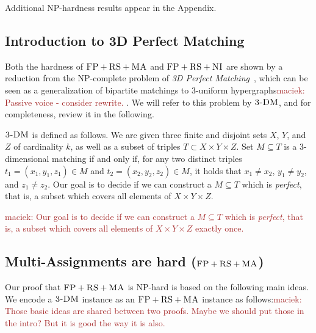 \documentclass[9pt]{sigcomm-alternate}
\newcommand{\maciek}[1]{\textcolor{brown}{maciek: #1}}
\newcommand{\CC}{\textsc{NI}}
\newcommand{\FP}{\textsc{FP}}
\newcommand{\RS}{\textsc{RS}}
\newcommand{\MA}{\textsc{MA}}
\newcommand{\TDM}{\textsc{3-DM}}
\begin{document}
Additional NP-hardness results appear in the Appendix.

\subsection{Introduction to 3D Perfect Matching}

Both the hardness of $\FP+\RS+\MA$ and $\FP+\RS+\CC$ are shown by a reduction
from the NP-complete problem of \emph{3D Perfect Matching}~\cite{3dmatch},
which
can be seen as a generalization of bipartite matchings to 3-uniform
hypergraphs\maciek{Passive voice - consider rewrite.}
. We will refer to this problem by $\TDM$, and for completeness,
review it in the following.

$\TDM$ is defined as follows. We are given three finite and disjoint
sets $X$, $Y$, and $Z$ of cardinality $k$, as well as a subset of triples $T\subset
X \times Y \times Z$.  Set $M \subseteq T$ is a 3-dimensional matching
if and only if, for any two distinct triples $t_1=(x_1, y_1, z_1) \in M$
and $t_2=(x_2, y_2, z_2) \in M$, it holds that $x_1\neq x_2$, $y_1\neq
y_2$, and $z_1\neq z_2$. Our goal is to decide if we can construct
a $M \subseteq T$ which is \emph{perfect}, that is, a subset which covers all
elements of $X \times Y \times Z$.

\maciek{Our goal is to decide if we can construct
a $M \subseteq T$ which is \emph{perfect}, that is, a subset which covers all
elements of $X \times Y \times Z$ exactly once. }


\subsection{Multi-Assignments are hard ($\FP+\RS+\MA$)}\label{ssec:fprsma}

Our proof that $\FP+\RS+\MA$ is NP-hard is based on the following main ideas.
We encode a $\TDM$ instance as an $\FP+\RS+\MA$ instance as follows:\maciek{Those basic ideas are shared between two proofs. Maybe we should put those in the intro? But it is good the way it is also.}
\end{document}
